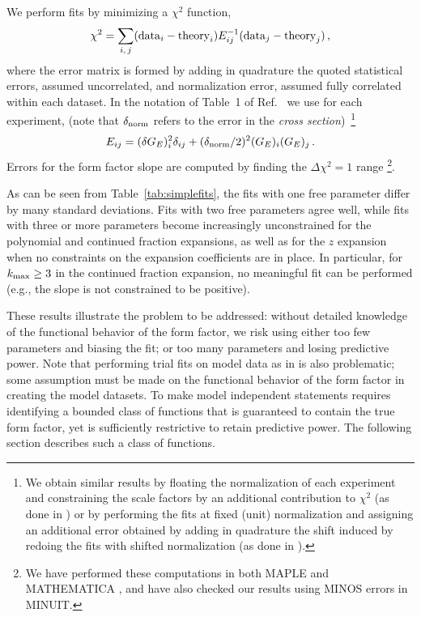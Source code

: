 \documentclass[12pt]{article}
\newcommand{\be}{\begin{equation}}
\newcommand{\ee}{\end{equation}}
\begin{document}
We perform fits by minimizing a $\chi^2$ function, 
\be
\chi^2 = \sum_{i,\,j} ( {\rm data}_i - {\rm theory}_i ) E^{-1}_{ij} (  {\rm data}_j - {\rm theory}_j )  \,,
\ee
where the error matrix is formed by adding in quadrature the
quoted statistical errors, assumed uncorrelated, and  normalization error, assumed fully correlated within
each dataset.
In the notation of Table~1 of Ref.~\cite{Rosenfelder:1999cd} we use for each experiment, (note that $\delta_{\rm norm}$ refers
to the error in the {\it cross section})~\footnote{ 
%
We obtain similar results by floating the normalization of each experiment and
constraining the scale factors by an additional contribution to $\chi^2$ (as done in \cite{Rosenfelder:1999cd}) 
or by performing the fits at fixed (unit) normalization and assigning an additional error 
obtained by adding in quadrature the shift induced by redoing the fits with shifted normalization (as done in \cite{Sick:2003gm}). 
%
}
\be
E_{ij} = (\delta G_E)^2_i \delta_{ij} +  ( \delta_{\rm norm}/2 )^2 (G_E)_i (G_E)_j \,.
\ee
Errors for the form factor slope are computed by finding the $\Delta \chi^2=1$ range%
%
\footnote{
  We have performed these computations in both MAPLE and MATHEMATICA ,  and
have also checked our results using MINOS errors in MINUIT.   
}.
%

As can be seen from Table~\ref{tab:simplefits}, 
the fits with one free parameter differ by many standard deviations. 
Fits with two free parameters agree well, while fits with three or more parameters become increasingly 
unconstrained for the polynomial and continued fraction expansions,  
as well as for the $z$ expansion when no  constraints on the expansion coefficients are in place. 
In particular, for $k_{\rm max} \ge 3$ in the continued fraction 
expansion, no meaningful fit can be performed (e.g., the slope is not constrained to be positive). 

These results illustrate the problem to be addressed: without detailed knowledge of the 
functional behavior of the form factor, we risk using either too few parameters and 
biasing the fit; or too many parameters and losing predictive power.  
Note that performing trial fits on model data as in \cite{Sick:2003gm} is 
also problematic; some assumption must be made on the functional behavior of the form 
factor in creating the model datasets.
To make model independent statements requires identifying 
a bounded class of functions that is guaranteed  to contain the true form factor, 
yet is sufficiently restrictive to retain predictive power.  
The following section describes such a class of functions. 
\end{document}
